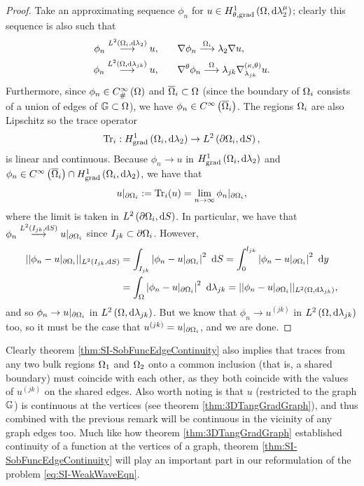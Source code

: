 \begin{proof}
	Take an approximating sequence $\phi_n$ for $u\in H^1_{\theta, \mathrm{grad}}\left( \Omega, \mathrm{d}\lambda_2^{\mu} \right)$; clearly this sequence is also such that
	\begin{align*}
		\phi_n \overset{L^{2}\left( \Omega_i,\mathrm{d} \lambda_2 \right)}{\longrightarrow} u, &\qquad \nabla\phi_n\overset{\Omega_i}{\longrightarrow}{\lambda_2}\nabla u, \\
		\phi_n \overset{L^{2}\left( \Omega,\mathrm{d} \lambda_{jk} \right)}{\longrightarrow} u, &\qquad \nabla^{\theta}\phi_n\overset{\Omega}{\longrightarrow}{\lambda_{jk}}\nabla^{\left( \kappa, \theta \right)}_{\lambda_{jk}} u.
	\end{align*}
	Furthermore, since $\phi_n\in C^{\infty}_{\#}\left( \Omega \right)$ and $\overline{\Omega}_i\subset\Omega$ (since the boundary of $\Omega_i$ consists of a union of edges of $\mathbb{G}\subset\Omega$), we have $\phi_n\in C^{\infty}\left( \overline{\Omega}_i \right)$.
	The regions $\Omega_i$ are also Lipschitz so the trace operator
	\begin{align*}
		\mathrm{Tr}_i: H^1_\mathrm{grad}\left( \Omega_i, \mathrm{d}\lambda_2 \right) \rightarrow L^{2}\left( \partial\Omega_i,\mathrm{d} S \right),
	\end{align*}
	is linear and continuous.
	Because $\phi_n\rightarrow u$ in $H^1_\mathrm{grad}\left( \Omega_i, \mathrm{d}\lambda_2 \right)$ and $\phi_n\in C^{\infty}\left( \overline{\Omega}_i \right)\cap H^1_\mathrm{grad}\left( \Omega_i, \mathrm{d}\lambda_2 \right)$, we have that
	\begin{align*}
		u\vert_{\partial\Omega_i} := \mathrm{Tr}_i(u) = \lim_{n\rightarrow\infty}\phi_n\vert_{\partial\Omega_i},
	\end{align*}
	where the limit is taken in $L^{2}\left( \partial\Omega_i,\mathrm{d} S \right)$.
	In particular, we have that $\phi_n\overset{L^{2}\left( I_{jk},\mathrm{d} S \right)}{\longrightarrow}u\vert_{\partial\Omega_i}$ since $I_{jk}\subset\partial\Omega_i$.
	However,
	\begin{align*}
		\norm{ \phi_n - u\vert_{\partial\ddom_i} }_{\ltwo{I_{jk}}{S}}
		&= \integral{I_{jk}}{\abs{ \phi_n - u\vert_{\partial\ddom_i} }^2}{S}
		= \int_0^{l_{jk}} \abs{ \phi_n - u\vert_{\partial\ddom_i} }^2 \ \md y \\
		&= \integral{\ddom}{\abs{ \phi_n - u\vert_{\partial\ddom_i} }^2}{\lambda_{jk}}
		= \norm{ \phi_n - u\vert_{\partial\ddom_i} }_{\ltwo{\ddom}{\lambda_{jk}}},
	\end{align*}
	and so $\phi_n\rightarrow u\vert_{\partial\Omega_i}$ in $L^{2}\left( \Omega,\mathrm{d} \lambda_{jk} \right)$.
	But we know that $\phi_n\rightarrow u^{(jk)}$ in $L^{2}\left( \Omega,\mathrm{d} \lambda_{jk} \right)$ too, so it must be the case that $u^{(jk)} = u\vert_{\partial\Omega_i}$, and we are done.
\end{proof}
Clearly theorem \ref{thm:SI-SobFuncEdgeContinuity} also implies that traces from any two bulk regions $\Omega_1$ and $\Omega_2$ onto a common inclusion (that is, a shared boundary) must coincide with each other, as they both coincide with the values of $u^{(jk)}$ on the shared edges.
Also worth noting is that $u$ (restricted to the graph $\mathbb{G}$) is continuous at the vertices (see theorem \ref{thm:3DTangGradGraph}), and thus combined with the previous remark will be continuous in the vicinity of any graph edges too.
Much like how theorem \ref{thm:3DTangGradGraph} established continuity of a function at the vertices of a graph, theorem \ref{thm:SI-SobFuncEdgeContinuity} will play an important part in our reformulation of the problem \eqref{eq:SI-WeakWaveEqn}.